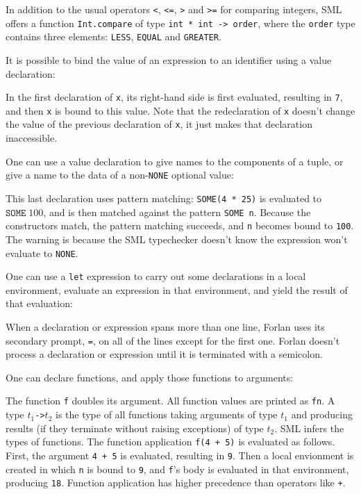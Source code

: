 In addition to the usual operators \texttt{<}, \texttt{<=}, \texttt{>}
and \texttt{>=} for comparing integers, SML offers a function
\texttt{Int.compare} of type \texttt{int~*~int~->~order}, where the
\texttt{order} type contains three elements: \texttt{LESS},
\texttt{EQUAL} and \texttt{GREATER}.  

It is possible to bind the value of an expression to an
identifier using a value declaration:
%
%

In the first declaration of \texttt{x}, its right-hand side is first
evaluated, resulting in \texttt{7}, and then \texttt{x} is bound to
this value.  Note that the redeclaration of \texttt{x} doesn't change
the value of the previous declaration of \texttt{x}, it just makes
that declaration inaccessible.

One can use a value declaration to give names to the
components of a tuple, or give a name to the data of a
non-\texttt{NONE} optional value:

This last declaration uses pattern matching: \texttt{SOME(4~*~25)}
is evaluated to $\mathtt{SOME}\;100$, and is then matched against the
pattern \texttt{SOME~n}.  Because the constructors match, the
pattern matching succeeds, and \texttt{n} becomes bound to \texttt{100}.
The warning is because the SML typechecker doesn't know the
expression won't evaluate to \texttt{NONE}.

One can use a \texttt{let} expression to carry out some declarations
in a local environment, evaluate an expression in that environment, and
yield the result of that evaluation:

When a declaration or expression spans more than one line, Forlan
uses its secondary prompt, \texttt{=}, on all of the lines except
%
%
for the first one.  Forlan doesn't process a declaration or expression
until it is terminated with a semicolon.
%

One can declare functions, and apply those functions to arguments:%
%
%

The function \texttt{f} doubles its argument.
All function values are printed as \texttt{fn}.
%
%
A type \texttt{$t_1$\;->\;$t_2$} is the type of all functions taking
%
arguments of type $t_1$ and producing results (if they terminate
without raising exceptions) of type $t_2$.  SML infers the types of
functions.  The function application \texttt{f(4~+~5)} is evaluated as
follows.  First, the argument \texttt{4~+~5} is evaluated, resulting
in \texttt{9}.  Then a local envionment is created in which \texttt{n}
is bound to \texttt{9}, and \texttt{f}'s body is evaluated in that
environment, producing \texttt{18}.  Function application has higher
precedence than operators like \texttt{+}.

